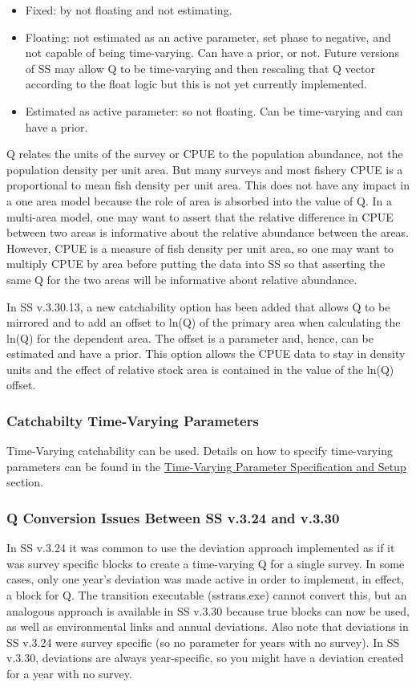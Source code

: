 \begin{itemize}
	\item Fixed: by not floating and not estimating.

	\item Floating: not estimated as an active parameter, set phase to negative, and not capable of being time-varying.  Can have a prior, or not. Future versions of SS may allow Q to be time-varying and then rescaling that Q vector according to the float logic but this is not yet currently implemented.

	\item Estimated as active parameter: so not floating. Can be time-varying and can have a prior.
\end{itemize}


Q relates the units of the survey or CPUE to the population abundance, not the population density per unit area.  But many surveys and most fishery CPUE is a proportional to mean fish density per unit area.  This does not have any impact in a one area model because the role of area is absorbed into the value of Q.  In a multi-area model, one may want to assert that the relative difference in CPUE between two areas is informative about the relative abundance between the areas.   However, CPUE is a measure of fish density per unit area, so one may want to multiply CPUE by area before putting the data into SS so that asserting the same Q for the two areas will be informative about relative abundance.

In SS v.3.30.13, a new catchability option has been added that allows Q to be mirrored and to add an offset to ln(Q) of the primary area when calculating the ln(Q) for the dependent area. The offset is a parameter and, hence, can be estimated and have a prior. This option allows the CPUE data to stay in density units and the effect of relative stock area is contained in the value of the ln(Q) offset.

\subsubsection{Catchabilty Time-Varying Parameters}
Time-Varying catchability can be used. Details on how to specify time-varying parameters can be found in the \hyperlink{tvOrder}{Time-Varying Parameter Specification and Setup} section.

\subsubsection{Q Conversion Issues Between SS v.3.24 and v.3.30}
In SS v.3.24 it was common to use the deviation approach implemented as if it was survey specific blocks to create a time-varying Q for a single survey.  In some cases, only one year's deviation was made active in order to implement, in effect, a block for Q.  The transition executable (sstrans.exe) cannot convert this, but an analogous approach is available in SS v.3.30 because true blocks can now be used, as well as environmental links and annual deviations. Also note that deviations in SS v.3.24 were survey specific (so no parameter for years with no survey). In SS v.3.30, deviations are always year-specific, so you might have a deviation created for a year with no survey.

